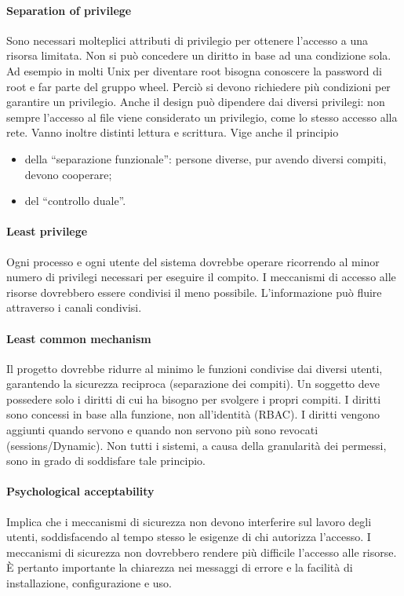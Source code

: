 \paragraph{Separation of privilege}
Sono necessari molteplici attributi di privilegio per ottenere
l'accesso a una risorsa limitata.
Non si può concedere un diritto in base ad una condizione sola.
Ad esempio in molti Unix per
diventare root bisogna conoscere la password di root e far parte del gruppo wheel.
Perciò si devono richiedere più condizioni per garantire un privilegio.
Anche il design può dipendere dai diversi privilegi: non sempre l'accesso al
file viene considerato
un privilegio, come lo stesso accesso alla rete.
Vanno inoltre distinti lettura e scrittura.
Vige anche il principio

\begin{itemize}
    \item della “separazione funzionale”: persone diverse, pur avendo diversi
          compiti, devono cooperare;
    \item del “controllo duale”.
\end{itemize}

\paragraph{Least privilege}
Ogni processo e ogni utente del sistema dovrebbe operare ricorrendo al
minor numero di privilegi necessari per eseguire il compito.
I meccanismi di accesso alle risorse dovrebbero essere condivisi il meno possibile.
L'informazione può fluire attraverso i canali condivisi.

\paragraph{Least common mechanism}
Il progetto dovrebbe ridurre al minimo le funzioni condivise dai
diversi utenti, garantendo la sicurezza reciproca (separazione dei compiti).
Un soggetto deve possedere solo i diritti di cui ha bisogno per svolgere i propri
compiti. I diritti sono concessi in base alla funzione, non all'identità (RBAC).
I diritti vengono aggiunti quando servono e quando non servono più sono revocati
(sessions/Dynamic).
Non tutti i sistemi, a causa della granularità dei permessi, sono in grado di
soddisfare tale principio.

\paragraph{Psychological acceptability}
Implica che i meccanismi di sicurezza non devono interferire
sul lavoro degli utenti, soddisfacendo al tempo stesso le esigenze di chi
autorizza l'accesso.
I meccanismi di sicurezza non dovrebbero rendere più difficile l'accesso alle
risorse. È pertanto importante la chiarezza nei messaggi di errore e la
facilità di installazione, configurazione e uso.

